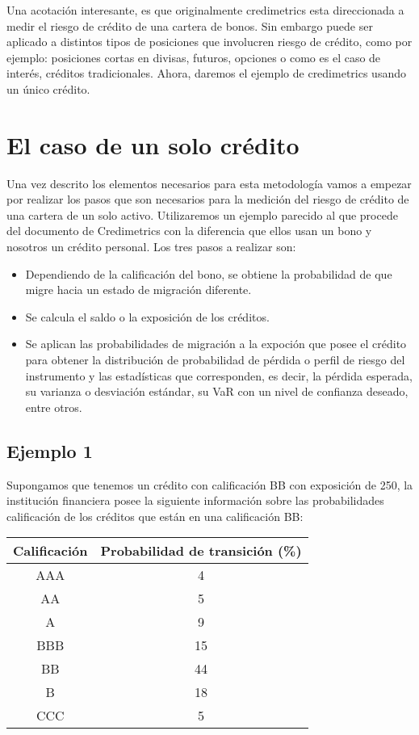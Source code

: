 \documentclass[
  12pt,
]{krantz}
\theoremstyle{definition}
\theoremstyle{definition}
\theoremstyle{definition}
\theoremstyle{remark}
\begin{document}
Una acotación interesante, es que originalmente credimetrics esta direccionada a medir el riesgo de crédito de una cartera de bonos. Sin embargo puede ser aplicado a distintos tipos de posiciones que involucren riesgo de crédito, como por ejemplo: posiciones cortas en divisas, futuros, opciones o como es el caso de interés, créditos tradicionales. Ahora, daremos el ejemplo de credimetrics usando un único crédito.

\hypertarget{el-caso-de-un-solo-credito}{%
\section{El caso de un solo crédito}\label{el-caso-de-un-solo-credito}}

Una vez descrito los elementos necesarios para esta metodología vamos a empezar por realizar los pasos que son necesarios para la medición del riesgo de crédito de una cartera de un solo activo. Utilizaremos un ejemplo parecido al que procede del documento de Credimetrics con la diferencia que ellos usan un bono y nosotros un crédito personal. Los tres pasos a realizar son:

\begin{itemize}
\item
  Dependiendo de la calificación del bono, se obtiene la probabilidad de que migre hacia un estado de migración diferente.
\item
  Se calcula el saldo o la exposición de los créditos.
\item
  Se aplican las probabilidades de migración a la expoción que posee el crédito para obtener la distribución de probabilidad de pérdida o perfil de riesgo del instrumento y las estadísticas que corresponden, es decir, la pérdida esperada, su varianza o desviación estándar, su VaR con un nivel de confianza deseado, entre otros.
\end{itemize}

\hypertarget{ejemplo-1}{%
\subsection{Ejemplo 1}\label{ejemplo-1}}

Supongamos que tenemos un crédito con calificación BB con exposición de 250, la institución financiera posee la siguiente información sobre las probabilidades calificación de los créditos que están en una calificación BB:

\begin{longtable}[]{@{}cc@{}}
\toprule
Calificación & Probabilidad de transición (\%)\tabularnewline
\midrule
\endhead
AAA & 4\tabularnewline
AA & 5\tabularnewline
A & 9\tabularnewline
BBB & 15\tabularnewline
BB & 44\tabularnewline
B & 18\tabularnewline
CCC & 5\tabularnewline
\bottomrule
\end{longtable}
\end{document}
